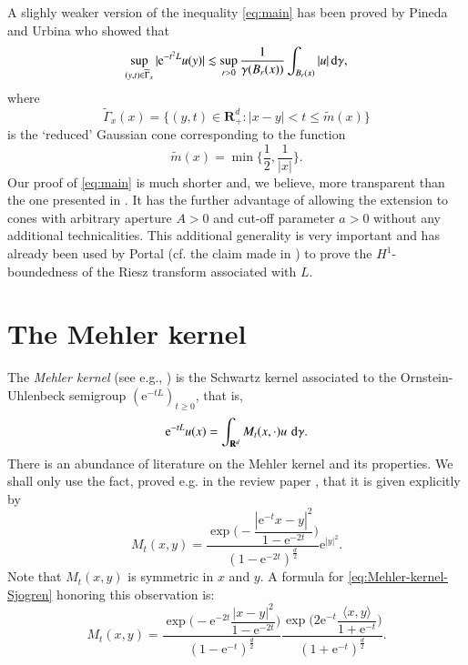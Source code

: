 \documentclass[preprint,12pt]{elsarticle}
\theoremstyle{remark}
\newcommand{\D}{\,\textup{d}}
\newcommand{\la}{\langle}
\newcommand{\ra}{\rangle}
\renewcommand{\leq}{\leqslant}
\renewcommand{\geq}{\geqslant}
\newcommand{\R}{\mathbf R}
\newcommand{\e}{\mathrm{e}} %
\begin{document}
A slighly weaker version of the inequality \eqref{eq:main} has been proved by 
Pineda and Urbina \cite{Pineda2008} who showed that 
\begin{equation*}
  \sup_{(y, t) \in \widetilde{\Gamma}_x} |\e^{-t^2 L} u(y)|
  \lesssim \sup_{r > 0}  \frac1{\gamma(B_r(x))}\int_{B_r(x)} |u| \D\gamma,
\end{equation*}
where
\begin{equation*}
  \widetilde{\Gamma}_x(x) = \{(y, t) \in \R^d_+ : |x - y| < t \leq
  \widetilde{m}(x)\}
\end{equation*}
is the `reduced' Gaussian cone corresponding to the function
\begin{equation*}
  \widetilde{m}(x) = \min\biggl\{\frac12, \frac1{|x|}\biggr\}.
\end{equation*}
Our proof of \eqref{eq:main} is much shorter and, we believe, more transparent
than the one presented in \cite{Pineda2008}. It has the further advantage of
allowing the extension to cones with arbitrary aperture $A > 0$ and cut-off
parameter $a > 0$ without any additional technicalities. This additional
generality is very important and has already been used by Portal (cf. the claim
made in \cite[discussion preceding Lemma 2.3]{Portal2012}) to prove the
$H^1$-boundedness of the Riesz transform associated with $L$.

\section{The Mehler kernel}
The \textit{Mehler kernel} (see e.g., \cite{Sjogren1997}) is the Schwartz
kernel associated to the Ornstein-Uhlenbeck semigroup $(\e^{-tL})_{t \geq 0}$,
that is,
\begin{equation}
  \label{eq:Ornstein-Uhlenbeck-semigroup-integral}
  \e^{-tL} u(x) = \int_{\R^d} M_t(x, \cdot) u \, \D\gamma.
\end{equation}
There is an abundance of literature on the Mehler kernel and its
properties. We shall only use the fact, proved e.g. in the review paper
\cite{Sjogren1997}, that it is given explicitly by
\begin{equation}
  \label{eq:Mehler-kernel-Sjogren}
  M_t(x,y) = \frac{\exp\biggl(-\dfrac{|\e^{-t} x - y|^2}{1 - \e^{-2t}}
    \biggr)}{(1 - \e^{-2t})^{\frac{d}2}} \e^{|y|^2}.
\end{equation}
Note that $M_t(x,y)$ is symmetric in $x$ and $y$. A formula for
\eqref{eq:Mehler-kernel-Sjogren} honoring this observation is:
\begin{equation}
  \label{eq:Mehler-kernel}
  M_t(x, y) = \frac{\exp\biggl(-\e^{-2t} \dfrac{|x - y|^2}{1
      - \e^{-2 t}}  \biggr)}{(1 - \e^{-t})^{\frac{d}2}}
  \frac{\exp\biggl(2\e^{-t} \dfrac{\la x, y \ra}{1 + \e^{-t}}
    \biggr)}{(1 + \e^{-t})^{\frac{d}2}}.
\end{equation}
\end{document}
